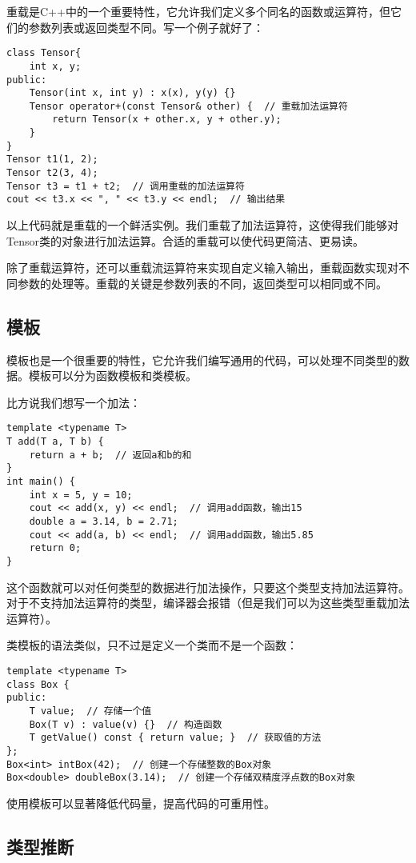 \documentclass[../main.tex]{subfiles}
\begin{document}
重载是C++中的一个重要特性，它允许我们定义多个同名的函数或运算符，但它们的参数列表或返回类型不同。写一个例子就好了：

\begin{lstlisting}
class Tensor{
    int x, y;
public:
    Tensor(int x, int y) : x(x), y(y) {}
    Tensor operator+(const Tensor& other) {  // 重载加法运算符
        return Tensor(x + other.x, y + other.y);
    }
}
Tensor t1(1, 2);
Tensor t2(3, 4);
Tensor t3 = t1 + t2;  // 调用重载的加法运算符
cout << t3.x << ", " << t3.y << endl;  // 输出结果
\end{lstlisting}
以上代码就是重载的一个鲜活实例。我们重载了加法运算符，这使得我们能够对Tensor类的对象进行加法运算。合适的重载可以使代码更简洁、更易读。

除了重载运算符，还可以重载流运算符来实现自定义输入输出，重载函数实现对不同参数的处理等。重载的关键是参数列表的不同，返回类型可以相同或不同。

\subsection{模板}

模板也是一个很重要的特性，它允许我们编写通用的代码，可以处理不同类型的数据。模板可以分为函数模板和类模板。

比方说我们想写一个加法：
\begin{lstlisting}
template <typename T>
T add(T a, T b) {
    return a + b;  // 返回a和b的和
}
int main() {
    int x = 5, y = 10;
    cout << add(x, y) << endl;  // 调用add函数，输出15
    double a = 3.14, b = 2.71;
    cout << add(a, b) << endl;  // 调用add函数，输出5.85
    return 0;
}
\end{lstlisting}
这个函数就可以对任何类型的数据进行加法操作，只要这个类型支持加法运算符。对于不支持加法运算符的类型，编译器会报错（但是我们可以为这些类型重载加法运算符）。

类模板的语法类似，只不过是定义一个类而不是一个函数：
\begin{lstlisting}
template <typename T>
class Box {
public:
    T value;  // 存储一个值
    Box(T v) : value(v) {}  // 构造函数
    T getValue() const { return value; }  // 获取值的方法
};
Box<int> intBox(42);  // 创建一个存储整数的Box对象
Box<double> doubleBox(3.14);  // 创建一个存储双精度浮点数的Box对象
\end{lstlisting}
使用模板可以显著降低代码量，提高代码的可重用性。

\subsection{类型推断}
\end{document}
